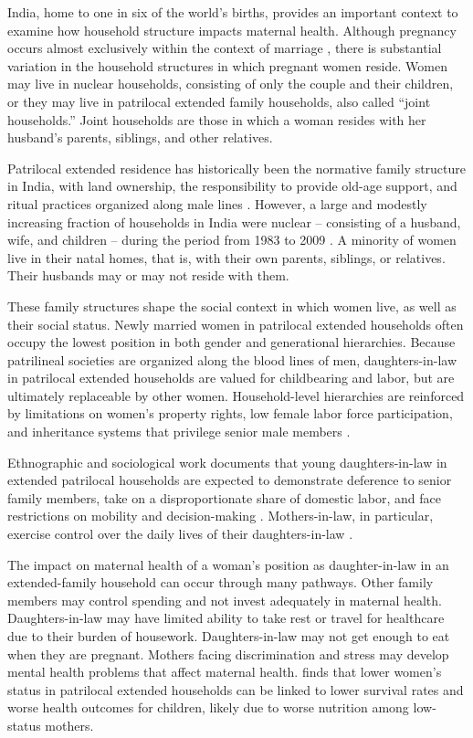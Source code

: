 \documentclass[12pt]{article}
\begin{document}
India, home to one in six of the world’s births, provides an important context to examine how household structure impacts maternal health.  Although pregnancy occurs almost exclusively within the context of marriage \citep{banerji2021does}, there is substantial variation in the household structures in which pregnant women reside. Women may live in nuclear households, consisting of only the couple and their children, or they may live in patrilocal extended family households, also called ``joint households.''  Joint households are those in which a woman resides with her husband’s parents, siblings, and other relatives.  

Patrilocal extended residence has historically been the normative family structure in India, with land ownership, the responsibility to provide old-age support, and ritual practices organized along male lines \citep{jayachandran2015roots}.  However, a large and modestly increasing fraction of households in India were nuclear -- consisting of a husband, wife, and children -- during the period from 1983 to 2009 \citep{breton2021modernisation}.  A minority of women live in their natal homes, that is, with their own parents, siblings, or relatives.  Their husbands may or may not reside with them.

These family structures shape the social context in which women live, as well as their social status. Newly married women in patrilocal extended households often occupy the lowest position in both gender and generational hierarchies. Because patrilineal societies are organized along the blood lines of men, daughters-in-law in patrilocal extended households are valued for childbearing and labor, but are ultimately replaceable by other women. Household-level hierarchies are reinforced by limitations on women's property rights, low female labor force participation, and inheritance systems that privilege senior male members \citep{jayachandran2015roots}.

Ethnographic and sociological work documents that young daughters-in-law in extended patrilocal households are expected to demonstrate deference to senior family members, take on a disproportionate share of domestic labor, and face restrictions on mobility and decision-making \citep{mandelbaum1988women, jeffery1989labour, gupta1999lifeboat}.  Mothers-in-law, in particular, exercise control over the daily lives of their daughters-in-law \citep{desai2005women, bloom2001dimensions}. 

The impact on maternal health of a woman's position as daughter-in-law in an extended-family household can occur through many pathways. Other family members may control spending and not invest adequately in maternal health. Daughters-in-law may have limited ability to take rest or travel for healthcare due to their burden of housework. Daughters-in-law may not get enough to eat when they are pregnant. Mothers facing discrimination and stress may develop mental health problems that affect maternal health. \cite{coffey2022mothers} finds that lower women’s status in patrilocal extended households can be linked to lower survival rates and worse health outcomes for children, likely due to worse nutrition among low-status mothers.
\end{document}
